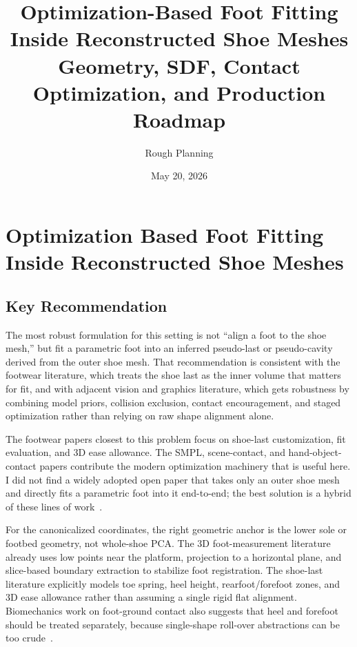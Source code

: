 \documentclass[11pt]{article}
\title{\textbf{Optimization-Based Foot Fitting Inside Reconstructed Shoe Meshes}\\
\large Geometry, SDF, Contact Optimization, and Production Roadmap}
\author{Rough Planning}
\date{May 20, 2026}
\begin{document}
\maketitle
\linenumbers
\modulolinenumbers[1]
\tableofcontents
\newpage

\section{Optimization Based Foot Fitting Inside Reconstructed Shoe Meshes}

\subsection{Key Recommendation}

The most robust formulation for this setting is not ``align a foot to the shoe mesh,'' but fit a parametric foot into an inferred pseudo-last or pseudo-cavity derived from the outer shoe mesh. That recommendation is consistent with the footwear literature, which treats the shoe last as the inner volume that matters for fit, and with adjacent vision and graphics literature, which gets robustness by combining model priors, collision exclusion, contact encouragement, and staged optimization rather than relying on raw shape alignment alone.

The footwear papers closest to this problem focus on shoe-last customization, fit evaluation, and 3D ease allowance. The SMPL, scene-contact, and hand-object-contact papers contribute the modern optimization machinery that is useful here. I did not find a widely adopted open paper that takes only an outer shoe mesh and directly fits a parametric foot into it end-to-end; the best solution is a hybrid of these lines of work~\cite{bao-last,luximon-last,cad-last,fitness-lasts,ease-allowance,smplify,smplifyx,prox,posa,contactopt,cpf}.

For the canonicalized coordinates, the right geometric anchor is the lower sole or footbed geometry, not whole-shoe PCA. The 3D foot-measurement literature already uses low points near the platform, projection to a horizontal plane, and slice-based boundary extraction to stabilize foot registration. The shoe-last literature explicitly models toe spring, heel height, rearfoot/forefoot zones, and 3D ease allowance rather than assuming a single rigid flat alignment. Biomechanics work on foot-ground contact also suggests that heel and forefoot should be treated separately, because single-shape roll-over abstractions can be too crude~\cite{witana-foot-measurements,cad-foot-scan,toe-spring,rollover}.
\end{document}
